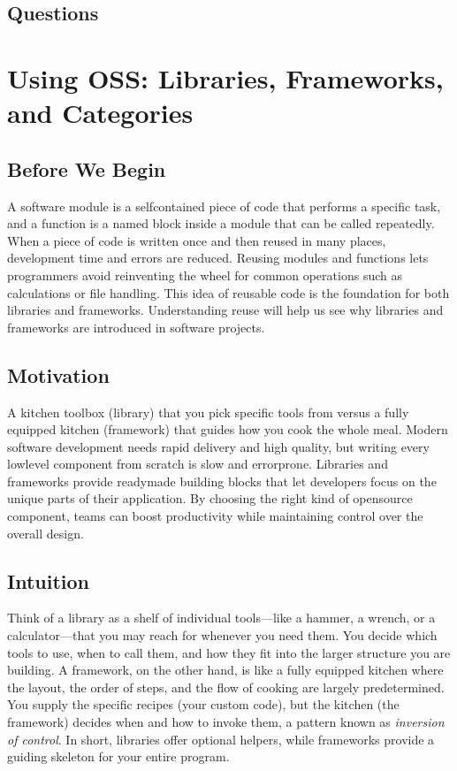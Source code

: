 \documentclass[12pt, a4paper]{article}
\begin{document}
\subsection*{Questions}

\newpage

\newpage

\section{Using OSS: Libraries, Frameworks, and Categories}

\subsection{Before We Begin}
A software module is a selfcontained piece of code that performs a specific task, and a function is a named block inside a module that can be called repeatedly.  When a piece of code is written once and then reused in many places, development time and errors are reduced.  Reusing modules and functions lets programmers avoid reinventing the wheel for common operations such as calculations or file handling.  This idea of reusable code is the foundation for both libraries and frameworks.  Understanding reuse will help us see why libraries and frameworks are introduced in software projects.  

\subsection{Motivation}
A kitchen toolbox (library) that you pick specific tools from versus a fully equipped kitchen (framework) that guides how you cook the whole meal.  Modern software development needs rapid delivery and high quality, but writing every lowlevel component from scratch is slow and errorprone.  Libraries and frameworks provide readymade building blocks that let developers focus on the unique parts of their application.  By choosing the right kind of opensource component, teams can boost productivity while maintaining control over the overall design.  

\subsection{Intuition}
Think of a library as a shelf of individual tools---like a hammer, a wrench, or a calculator---that you may reach for whenever you need them.  You decide which tools to use, when to call them, and how they fit into the larger structure you are building.  A framework, on the other hand, is like a fully equipped kitchen where the layout, the order of steps, and the flow of cooking are largely predetermined.  You supply the specific recipes (your custom code), but the kitchen (the framework) decides when and how to invoke them, a pattern known as \textit{inversion of control}.  In short, libraries offer optional helpers, while frameworks provide a guiding skeleton for your entire program.  
\end{document}
